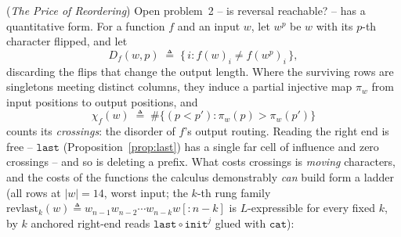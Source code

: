 
\begin{remark}
    (\emph{The Price of Reordering})
    \label{rem:price}
    Open problem~2 -- is reversal reachable? -- has a quantitative form.
    For a function $f$ and an input $w$, let $w^{p}$ be $w$ with its $p$-th
    character flipped, and let
    \[
        D_f(w,p) \;\triangleq\; \{\, i : f(w)_i \neq f(w^{p})_i \,\},
    \]
    discarding the flips that change the output length. Where the surviving
    rows are singletons meeting distinct columns, they induce a partial
    injective map $\pi_w$ from input positions to output positions, and
    \[
        \chi_f(w) \;\triangleq\; \#\{(p < p') : \pi_w(p) > \pi_w(p')\}
    \]
    counts its \emph{crossings}: the disorder of $f$'s output routing.
    Reading the right end is free -- $\mathtt{last}$
    (Proposition~\ref{prop:last}) has a single far cell of influence and
    zero crossings -- and so is deleting a prefix. What costs crossings is
    \emph{moving} characters, and the costs of the functions the calculus
    demonstrably \emph{can} build form a ladder (all rows at $|w| = 14$,
    worst input; the $k$-th rung family
    $\mathrm{revlast}_k(w) \triangleq w_{n-1} w_{n-2} \cdots w_{n-k}
    w[{:}n{-}k]$ is $L$-expressible for every fixed $k$, by $k$ anchored
    right-end reads $\mathtt{last} \circ \mathtt{init}^{j}$ glued with
    $\mathtt{cat}$):


\end{remark}
